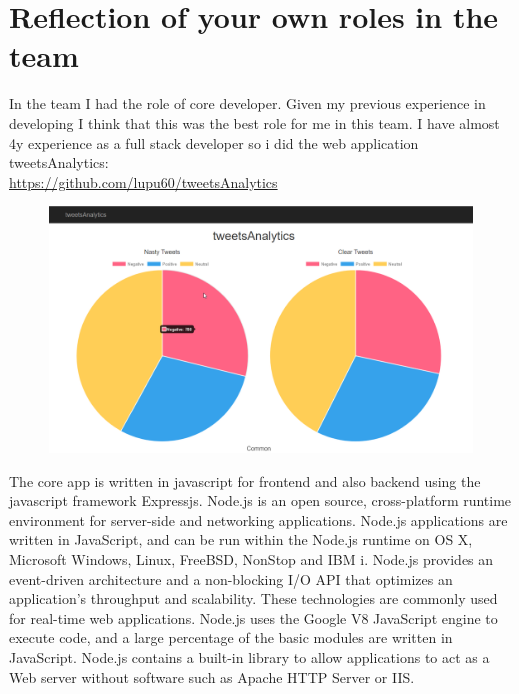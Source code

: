 
\chapter{Reflection of your own roles in the team} %

In the team I had the role of core developer. Given my previous experience in developing I think that this was the best role for me in this team. I have almost 4y experience as a full stack developer so i did the web application tweetsAnalytics:\\ \href{https://github.com/lupu60/tweetsAnalytics}{https://github.com/lupu60/tweetsAnalytics}

\begin{figure}[h]
	\centering
	\includegraphics[width=\textwidth]{images/app1.png}
\end{figure}
The core app is written in javascript for frontend and also backend using the javascript framework Expressjs. Node.js is an open source, cross-platform runtime environment for server-side and networking applications. Node.js applications are written in JavaScript, and can be run within the Node.js runtime on OS X, Microsoft Windows, Linux, FreeBSD, NonStop and IBM i.
Node.js provides an event-driven architecture and a non-blocking I/O API that optimizes an application's throughput and scalability. These technologies are commonly used for real-time web applications.
Node.js uses the Google V8 JavaScript engine to execute code, and a large percentage of the basic modules are written in JavaScript. Node.js contains a built-in library to allow applications to act as a Web server without software such as Apache HTTP Server or IIS.
